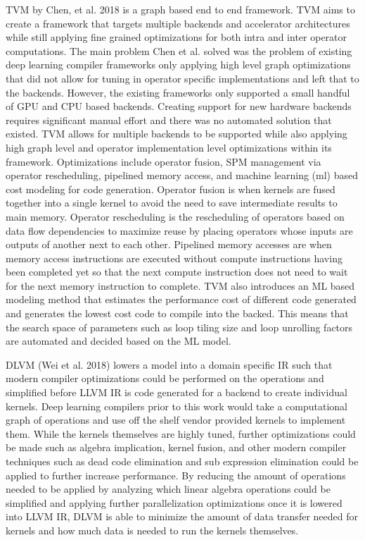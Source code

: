 TVM by Chen, et al. 2018 is a graph based end to end framework. 
TVM aims to create a framework that targets
multiple backends and accelerator architectures while still applying
fine grained optimizations for both intra and inter operator computations.
The main problem Chen et al. solved was the problem of existing deep learning
compiler frameworks only applying high level graph optimizations that did
not allow for tuning in operator specific implementations and left that to
the backends. However, the existing frameworks only supported a small handful
of GPU and CPU based backends. Creating support for new hardware backends
requires significant manual effort and there was no automated solution that 
existed. TVM allows for multiple backends to be supported while also
applying high graph level and operator implementation level optimizations
within its framework. Optimizations include operator fusion, SPM management via
operator rescheduling, pipelined memory access, and machine learning (ml) based
cost modeling for code generation. Operator fusion is when kernels are fused
together into a single kernel to avoid the need to save intermediate results
to main memory. Operator rescheduling is the rescheduling of operators based
on data flow dependencies to maximize reuse by placing operators whose
inputs are outputs of another next to each other. Pipelined memory accesses are
when memory access instructions are executed without compute instructions having
been completed yet so that the next compute instruction does not need to wait
for the next memory instruction to complete. TVM also introduces an ML
based modeling method that estimates the performance cost of different
code generated and generates the lowest cost code to compile into the backed.
This means that the search space of parameters such as loop tiling size and 
loop unrolling factors are automated and decided based on the ML model.

DLVM \cite{DLVM} (Wei et al. 2018) lowers a model into a domain specific IR
such that modern compiler optimizations could be performed on the operations
and simplified before LLVM IR is code generated for a backend to create
individual kernels. Deep learning compilers \cite{tensorflow} \cite{torch}
prior to this work would take a computational graph of operations and use off
the shelf vendor provided kernels to implement them. While the kernels
themselves are highly tuned, further optimizations could be made such as
algebra implication, kernel fusion, and other modern compiler techniques such
as dead code elimination and sub expression elimination could be applied to
further increase performance. By reducing the amount of operations needed to be
applied by analyzing which linear algebra operations could be simplified and
applying further parallelization optimizations once it is lowered into LLVM IR,
DLVM is able to minimize the amount of data transfer needed for kernels and how
much data is needed to run the kernels themselves.

